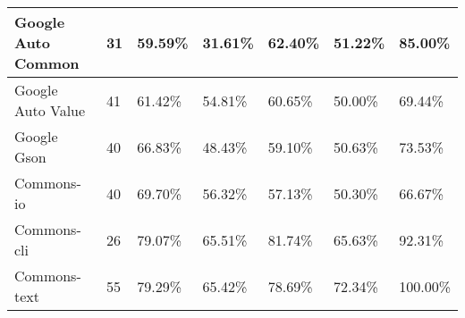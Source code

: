 \documentclass[../../main]{subfiles}
\begin{document}
\begin{table}[!htb]
\begin{tabular}{|l|l|l|l|l|l|l|}
Google Auto   Common  & 31                                                              & 59.59\%                                                              & 31.61\%                                                                    & 62.40\%                                                               & 51.22\%                                                            & 85.00\%                                                            \\ \hline
Google Auto   Value   & 41                                                              & 61.42\%                                                              & 54.81\%                                                                    & 60.65\%                                                               & 50.00\%                                                            & 69.44\%                                                            \\ \hline
Google Gson           & 40                                                              & 66.83\%                                                              & 48.43\%                                                                    & 59.10\%                                                               & 50.63\%                                                            & 73.53\%                                                            \\ \hline
Commons-io            & 40                                                              & 69.70\%                                                              & 56.32\%                                                                    & 57.13\%                                                               & 50.30\%                                                            & 66.67\%                                                            \\ \hline
Commons-cli           & 26                                                              & 79.07\%                                                              & 65.51\%                                                                    & 81.74\%                                                               & 65.63\%                                                            & 92.31\%                                                            \\ \hline
Commons-text          & 55                                                              & 79.29\%                                                              & 65.42\%                                                                    & 78.69\%                                                               & 72.34\%                                                            & 100.00\%                                                           \\ \hline

\end{tabular}
\end{table}
\end{document}

